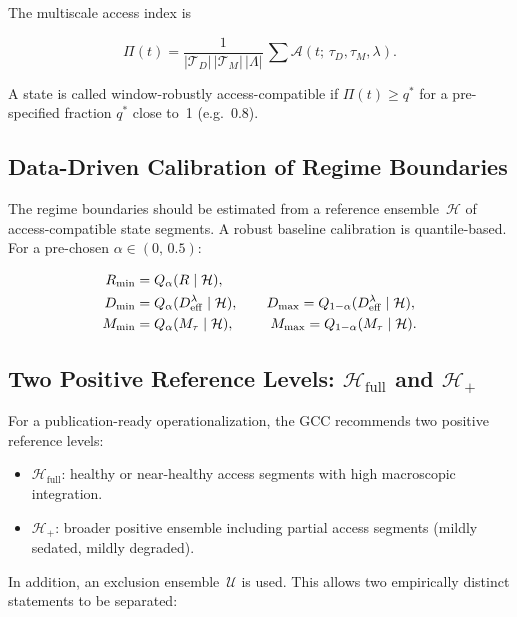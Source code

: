\documentclass[11pt,a4paper]{article}
\theoremstyle{plain}
\theoremstyle{definition}
\theoremstyle{remark}
\newcommand{\Deff}{D_{\mathrm{eff}}}
\newcommand{\Mtau}{M_{\tau}}
\newcommand{\Rmin}{R_{\min}}
\newcommand{\Dmin}{D_{\min}}
\newcommand{\Dmax}{D_{\max}}
\newcommand{\Mmin}{M_{\min}}
\newcommand{\Mmax}{M_{\max}}
\begin{document}
The multiscale access index is

\begin{equation}
\label{eq:Pi}
\Pi(t) = \frac{1}{|\mathcal{T}_D|\,|\mathcal{T}_M|\,|\Lambda|}\,\sum \mathcal{A}(t;\,\tau_D,\tau_M,\lambda).
\end{equation}

A state is called window-robustly access-compatible if $\Pi(t) \geq q^*$ for a pre-specified fraction $q^*$ close to~1 (e.g.\ 0.8).

\subsection{Data-Driven Calibration of Regime Boundaries}

The regime boundaries should be estimated from a reference ensemble~$\mathcal{H}$ of access-compatible state segments. A robust baseline calibration is quantile-based. For a pre-chosen $\alpha \in (0,\,0.5)$:

\begin{align}
\Rmin &= Q_{\alpha}(R \mid \mathcal{H}), \notag\\
\Dmin &= Q_{\alpha}(\Deff^{\lambda} \mid \mathcal{H}), \qquad
\Dmax = Q_{1-\alpha}(\Deff^{\lambda} \mid \mathcal{H}), \label{eq:kalib}\\
\Mmin &= Q_{\alpha}(\Mtau \mid \mathcal{H}), \qquad\;\;
\Mmax = Q_{1-\alpha}(\Mtau \mid \mathcal{H}). \notag
\end{align}

\subsection{Two Positive Reference Levels: $\mathcal{H}_{\mathrm{full}}$ and $\mathcal{H}_{+}$}

For a publication-ready operationalization, the GCC recommends two positive reference levels:

\begin{itemize}
\item $\mathcal{H}_{\mathrm{full}}$: healthy or near-healthy access segments with high macroscopic integration.
\item $\mathcal{H}_{+}$: broader positive ensemble including partial access segments (mildly sedated, mildly degraded).
\end{itemize}

In addition, an exclusion ensemble~$\mathcal{U}$ is used. This allows two empirically distinct statements to be separated:
\end{document}
